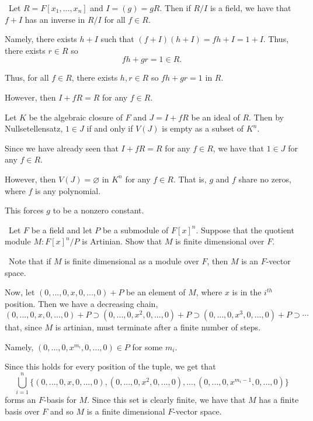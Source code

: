 \documentclass[12pt]{AlgebraQual}
\begin{document}
\begin{solution}$\,$
Let $R=F[x_1,...,x_n]$ and $I=(g)=gR$. Then if $R/I$ is a field, we have that $f+I$ has an inverse in $R/I$ for all $f\in R$.

Namely, there exists $h+I$ such that $(f+I)(h+I)=fh+I=1+I$. Thus, there exists $r\in R$ so $$fh+gr=1\in R.$$

Thus, for all $f\in R$, there exists $h,r\in R$ so $fh+gr=1$ in $R.$

However, then $I+fR=R$ for any $f\in R$.

Let $K$ be the algebraic closure of $F$ and $J=I+fR$ be an ideal of $R$. Then by Nullsetellensatz, $1\in J$ if and only if $V(J)$ is empty as a subset of $K^n$.

Since we have already seen that $I+fR=R$ for any $f\in R$, we have that $1\in J$ for any $f\in R$.

However, then $V(J)=\varnothing$ in $K^n$ for any $f\in R$. That is, $g$ and $f$ share no zeros, where $f$ is any polynomial.

This forces $g$ to be a nonzero constant.
\end{solution}
\newpage



\begin{problem} $\,$
Let $F$ be a field and let $P$ be a submodule of $F[x]^n.$ Suppose that the quotient module $M:F[x]^n/P$ is Artinian. Show that $M$ is finite dimensional over $F.$
\end{problem}


\begin{solution}$\,$
Note that if $M$ is finite dimensional as a module over $F$, then $M$ is an $F$-vector space.

Now, let $(0,...,0,x,0,...,0)+P$ be an element of $M$, where $x$ is in the $i^{th}$ position. Then we have a decreasing chain, $$(0,...,0,x,0,...,0)+P\supset(0,...,0,x^2,0,...,0)+P\supset(0,...,0,x^3,0,...,0)+P\supset\cdots$$ that, since $M$ is artinian, must terminate after a finite number of steps.

Namely, $(0,...,0,x^{m_i},0,...,0)\in P$ for some $m_i$.

Since this holds for every position of the tuple, we get that $$\bigcup_{i=1}^n\{(0,...,0,x,0,...,0),(0,...,0,x^2,0,...,0),...,(0,...,0,x^{m_i-1},0,...,0)\}$$ forms an $F$-basis for $M$. Since this set is clearly finite, we have that $M$ has a finite basis over $F$ and so $M$ is a finite dimensional $F$-vector space.
\end{solution}
\newpage
\end{document}
